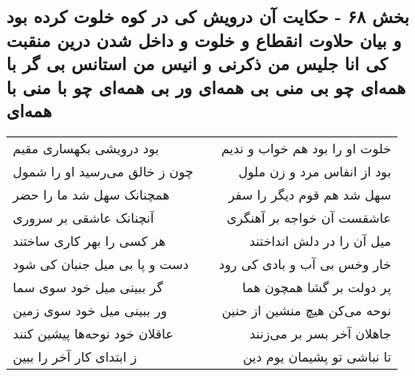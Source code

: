 \begin{center}
\section*{بخش ۶۸ - حکایت آن درویش کی در کوه خلوت کرده بود و بیان حلاوت انقطاع و خلوت و داخل شدن درین منقبت کی انا جلیس من ذکرنی و انیس من استانس بی گر با همه‌ای چو بی منی بی همه‌ای ور بی همه‌ای چو با منی با همه‌ای}
\label{sec:sh068}
\begin{longtable}{l p{0.5cm} r}
بود درویشی بکهساری مقیم
&&
خلوت او را بود هم خواب و ندیم
\\
چون ز خالق می‌رسید او را شمول
&&
بود از انفاس مرد و زن ملول
\\
همچنانک سهل شد ما را حضر
&&
سهل شد هم قوم دیگر را سفر
\\
آنچنانک عاشقی بر سروری
&&
عاشقست آن خواجه بر آهنگری
\\
هر کسی را بهر کاری ساختند
&&
میل آن را در دلش انداختند
\\
دست و پا بی میل جنبان کی شود
&&
خار وخس بی آب و بادی کی رود
\\
گر ببینی میل خود سوی سما
&&
پر دولت بر گشا همچون هما
\\
ور ببینی میل خود سوی زمین
&&
نوحه می‌کن هیچ منشین از حنین
\\
عاقلان خود نوحه‌ها پیشین کنند
&&
جاهلان آخر بسر بر می‌زنند
\\
ز ابتدای کار آخر را ببین
&&
تا نباشی تو پشیمان یوم دین
\\
\end{longtable}
\end{center}

